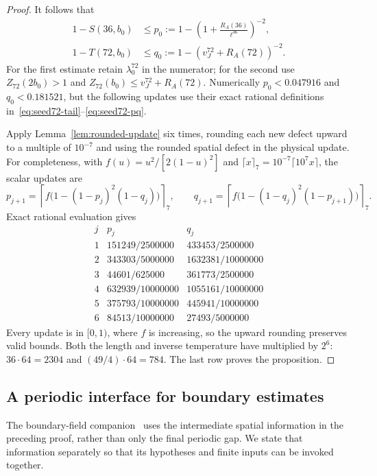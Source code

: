 \begin{proof}
It follows that
\begin{equation}\label{eq:seed72-pq}
\begin{aligned}
 1-S(36,b_0)&\le p_0:=1-\left(1+\frac{R_A(36)}{\ell^{36}}\right)^{-2},\\
 1-T(72,b_0)&\le q_0:=1-\left(v_J^{72}+R_A(72)\right)^{-2}.
\end{aligned}
\end{equation}
For the first estimate retain $\lambda_0^{72}$ in the numerator; for the
second use $Z_{72}(2b_0)>1$ and
$Z_{72}(b_0)\le v_J^{72}+R_A(72)$.  Numerically $p_0<0.047916$ and
$q_0<0.181521$, but the following updates use their exact rational
definitions in~\eqref{eq:seed72-tail}--\eqref{eq:seed72-pq}.

Apply Lemma~\ref{lem:rounded-update} six times, rounding
each new defect upward to a multiple of $10^{-7}$ and using the rounded
spatial defect in the physical update.  For completeness, with
$f(u)=u^2/[2(1-u)^2]$ and $\lceil x\rceil_7=10^{-7}\lceil10^7x\rceil$,
the scalar updates are
\[
 p_{j+1}=\left\lceil f\bigl(1-(1-p_j)^2(1-q_j)\bigr)\right\rceil_7,
 \qquad
 q_{j+1}=\left\lceil f\bigl(1-(1-q_j)^2(1-p_{j+1})\bigr)\right\rceil_7.
\]
Exact rational evaluation gives
\[
\begin{array}{c|cc}
 j&p_j&q_j\\ \hline
 1&151249/2500000&433453/2500000\\
 2&343303/5000000&1632381/10000000\\
 3&44601/625000&361773/2500000\\
 4&632939/10000000&1055161/10000000\\
 5&375793/10000000&445941/10000000\\
 6&84513/10000000&27493/5000000
\end{array}
\]
Every update is in $[0,1)$, where $f$ is increasing, so the upward rounding
preserves valid bounds.  Both the length and inverse temperature have
multiplied by $2^6$: $36\cdot64=2304$ and $(49/4)\cdot64=784$.
The last row proves the proposition.
\end{proof}

\subsection{A periodic interface for boundary estimates}

The boundary-field companion~\cite{BoundaryCompanion} uses the intermediate spatial information
in the preceding proof, rather than only the final periodic gap.
We state that information separately so that its hypotheses and finite
inputs can be invoked together.

